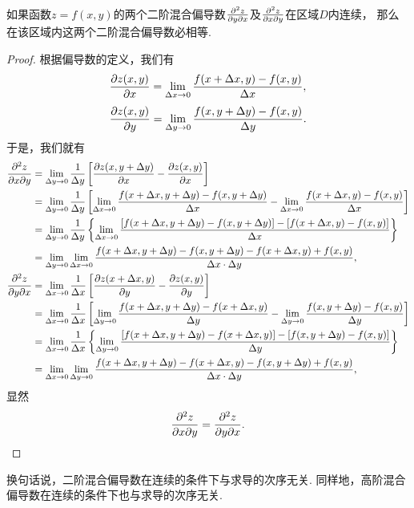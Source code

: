 \begin{theorem}
如果函数\(z=f(x,y)\)的两个二阶混合偏导数\(\pdv{z}{y}{x}\)及\(\pdv{z}{x}{y}\)在区域\(D\)内连续，
那么在该区域内这两个二阶混合偏导数必相等.
\begin{proof}
根据偏导数的定义，我们有
\[
	\pdv{z(x,y)}{x}
	= \lim_{\Delta x\to0} \frac{f(x+\Delta x,y)-f(x,y)}{\Delta x},
\]
	\[
	\pdv{z(x,y)}{y}
	= \lim_{\Delta y\to0} \frac{f(x,y+\Delta y)-f(x,y)}{\Delta y}.
\]
于是，我们就有
\begin{align*}
	\pdv[2]{z}{x}{y}
	&= \lim_{\Delta y\to0}
		\frac{1}{\Delta y}\left[\pdv{z(x,y+\Delta y)}{x} - \pdv{z(x,y)}{x}\right] \\
	&= \lim_{\Delta y\to0}
		\frac{1}{\Delta y}\left[\lim_{\Delta x\to0} \frac{f(x+\Delta x,y+\Delta y)-f(x,y+\Delta y)}{\Delta x} - \lim_{\Delta x\to0} \frac{f(x+\Delta x,y)-f(x,y)}{\Delta x}\right] \\
	&= \lim_{\Delta y\to0}
		\frac{1}{\Delta y}\left\{\lim_{\Delta x\to0} \frac{[f(x+\Delta x,y+\Delta y)-f(x,y+\Delta y)]-[f(x+\Delta x,y)-f(x,y)]}{\Delta x}\right\} \\
	&= \lim_{\Delta y\to0} \lim_{\Delta x\to0}
		\frac{f(x+\Delta x,y+\Delta y)-f(x,y+\Delta y)-f(x+\Delta x,y)+f(x,y)}{\Delta x \cdot \Delta y}, \\
	\pdv[2]{z}{y}{x}
	&= \lim_{\Delta x\to0}
		\frac{1}{\Delta x}\left[\pdv{z(x+\Delta x,y)}{y} - \pdv{z(x,y)}{y}\right] \\
	&= \lim_{\Delta x\to0}
		\frac{1}{\Delta x}\left[\lim_{\Delta y\to0} \frac{f(x+\Delta x,y+\Delta y)-f(x+\Delta x,y)}{\Delta y} - \lim_{\Delta y\to0} \frac{f(x,y+\Delta y)-f(x,y)}{\Delta y}\right] \\
	&= \lim_{\Delta x\to0}
		\frac{1}{\Delta x}\left\{\lim_{\Delta y\to0} \frac{[f(x+\Delta x,y+\Delta y)-f(x+\Delta x,y)]-[f(x,y+\Delta y)-f(x,y)]}{\Delta y}\right\} \\
	&= \lim_{\Delta x\to0} \lim_{\Delta y\to0}
		\frac{f(x+\Delta x,y+\Delta y)-f(x+\Delta x,y)-f(x,y+\Delta y)+f(x,y)}{\Delta x \cdot \Delta y}, \\
\end{align*}
显然\[
	\pdv[2]{z}{x}{y} = \pdv[2]{z}{y}{x}.
	\qedhere
\]
\end{proof}
\end{theorem}
换句话说，二阶混合偏导数在连续的条件下与求导的次序无关.
同样地，高阶混合偏导数在连续的条件下也与求导的次序无关.

